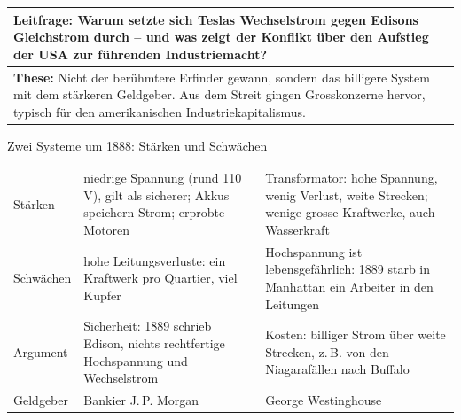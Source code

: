 \documentclass[10pt,a4paper]{article}
\begin{document}
\vspace{3mm}
\begin{tabularx}{\linewidth}{|Y|}
  \hline
  \textbf{Leitfrage:} Warum setzte sich Teslas Wechselstrom gegen Edisons Gleichstrom durch -- und was zeigt der
  Konflikt über den Aufstieg der USA zur führenden Industriemacht? \\ \hline
  \textbf{These:} Nicht der berühmtere Erfinder gewann, sondern das billigere System mit dem stärkeren Geldgeber.
  Aus dem Streit gingen Grosskonzerne hervor, typisch für den amerikanischen Industriekapitalismus. \\ \hline
\end{tabularx}

\begin{tabelle}{Zwei Systeme um 1888: Stärken und Schwächen}
\begin{tabularx}{\linewidth}{|C{21mm}|Y|Y|}
  \hline
  &  &  \\ \hline
  Stärken & niedrige Spannung (rund 110\,V), gilt als sicherer; Akkus speichern Strom; erprobte Motoren &
    Transformator: hohe Spannung, wenig Verlust, weite Strecken; wenige grosse Kraftwerke, auch Wasserkraft
    \cite[994]{kaick} \\ \hline
  Schwächen & hohe Leitungsverluste: ein Kraftwerk pro Quartier, viel Kupfer \cite{pearl} & Hochspannung ist
    lebensgefährlich: 1889 starb in Manhattan ein Arbeiter in den Leitungen  \\ \hline
  Argument & Sicherheit: 1889 schrieb Edison, nichts rechtfertige Hochspannung und Wechselstrom
     & Kosten: billiger Strom über weite Strecken, z.\,B. von den Niagarafällen nach Buffalo
     \\ \hline
  Geldgeber & Bankier J.\,P. Morgan  & George Westinghouse \cite[994]{kaick} \\ \hline
\end{tabularx}
\end{tabelle}
\end{document}
